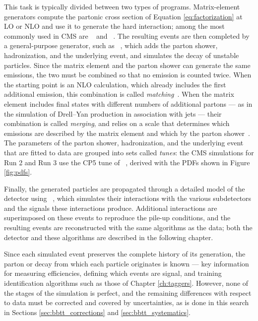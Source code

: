 This task is typically divided between two types of programs. Matrix-element generators compute the partonic cross section of Equation \ref{eq:factorization} at LO or NLO and use it to generate the hard interaction; among the most commonly used in CMS are \MGaMC~\cite{Alwall:2014hca} and \POWHEG~\cite{powheg1,powheg2,powheg3}. The resulting events are then completed by a general-purpose generator, such as \PYTHIA~\cite{Bierlich:2022pfr}, which adds the parton shower, hadronization, and the underlying event, and simulates the decay of unstable particles. Since the matrix element and the parton shower can generate the same emissions, the two must be combined so that no emission is counted twice. When the starting point is an NLO calculation, which already includes the first additional emission, this combination is called \textit{matching}~\cite{powheg2,Alwall:2014hca}. When the matrix element includes final states with different numbers of additional partons — as in the simulation of Drell–Yan production in association with jets — their combination is called \textit{merging}, and relies on a scale that determines which emissions are described by the matrix element and which by the parton shower~\cite{Frederix:2012ps}. The parameters of the parton shower, hadronization, and the underlying event that are fitted to data are grouped into sets called \textit{tunes}: the CMS simulations for Run 2 and Run 3 use the CP5 tune of \PYTHIA~\cite{CMS:2019csb}, derived with the PDFs shown in Figure \ref{fig:pdfs}.




Finally, the generated particles are propagated through a detailed model of the detector using \GEANT~\cite{GEANT4:2002zbu}, which simulates their interactions with the various subdetectors and the signals these interactions produce. Additional interactions are superimposed on these events to reproduce the pile-up conditions, and the resulting events are reconstructed with the same algorithms as the data; both the detector and these algorithms are described in the following chapter.

Since each simulated event preserves the complete history of its generation, the parton or decay from which each particle originates is known — key information for measuring efficiencies, defining which events are signal, and training identification algorithms such as those of Chapter \ref{ch:taggers}. However, none of the stages of the simulation is perfect, and the remaining differences with respect to data must be corrected and covered by uncertainties, as is done in this search in Sections \ref{sec:bbtt_corrections} and \ref{sec:bbtt_systematics}.\bigskip

